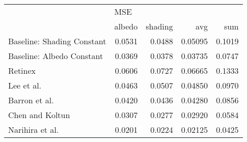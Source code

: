 \begin{tabular}{lrrrr}
\toprule
{} & \multicolumn{4}{l}{MSE} \\
{} &  albedo & shading &      avg &     sum \\
\midrule
Baseline: Shading Constant          &  0.0531 &  0.0488 &  0.05095 &  0.1019 \\
Baseline: Albedo Constant           &  0.0369 &  0.0378 &  0.03735 &  0.0747 \\
Retinex \cite{grosse2009}           &  0.0606 &  0.0727 &  0.06665 &  0.1333 \\
Lee et al. \cite{lee2012}           &  0.0463 &  0.0507 &  0.04850 &  0.0970 \\
Barron et al. \cite{barron2015}     &  0.0420 &  0.0436 &  0.04280 &  0.0856 \\
Chen and Koltun \cite{chen2013}     &  0.0307 &  0.0277 &  0.02920 &  0.0584 \\
Narihira et al. \cite{narihira2015} &  0.0201 &  0.0224 &  0.02125 &  0.0425 \\
\bottomrule
\end{tabular}

